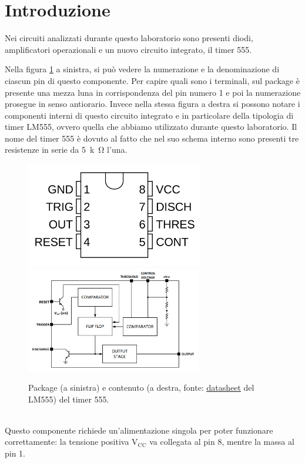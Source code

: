 \documentclass{report}
\begin{document}
\section*{Introduzione}
Nei circuiti analizzati durante questo laboratorio sono presenti diodi, amplificatori operazionali e un nuovo circuito integrato, il timer 555.\par
Nella figura \ref{figura:timer1} a sinistra, si può vedere la numerazione e la denominazione di ciascun pin di questo componente. Per capire quali sono i terminali, sul package è presente una mezza luna in corrispondenza del pin numero 1 e poi la numerazione prosegue in senso antiorario. Invece nella stessa figura a destra si possono notare i componenti interni di questo circuito integrato e in particolare della tipologia di timer LM555, ovvero quella che abbiamo utilizzato durante questo laboratorio. Il nome del timer 555 è dovuto al fatto che nel suo schema interno sono presenti tre resistenze in serie da \SI{5}{k\ohm} l'una.
\begin{figure}[h!]
	\centering
	\includegraphics[height=4.6cm]{immagini/timer1}
	\includegraphics[height=4.6cm]{immagini/timer2}
	\caption{Package (a sinistra) e contenuto (a destra, fonte: \textcolor{blue}{\underline{\href{https://www.ti.com/lit/ds/symlink/lm555.pdf?ts=1667144089940&ref_url=https\%253A\%252F\%252Fwww.ti.com\%252Fproduct\%252FLM555}{datasheet}}} del LM555) del timer 555.}
	\label{figura:timer1}
\end{figure}
\\Questo componente richiede un'alimentazione singola per poter funzionare correttamente: la tensione positiva $\mathrm{V_{CC}}$ va collegata al pin 8, mentre la massa al pin 1.\par
\end{document}
